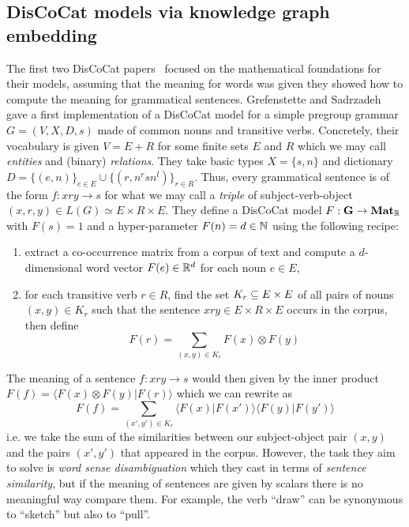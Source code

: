 
\subsection{DisCoCat models via knowledge graph embedding}

The first two DisCoCat papers~\cite{ClarkEtAl08,ClarkEtAl10} focused on the mathematical foundations for their models, assuming that the meaning for words was given they showed how to compute the meaning for grammatical sentences.
Grefenstette and Sadrzadeh~\cite{GrefenstetteSadrzadeh11} gave a first implementation of a DisCoCat model for a simple pregroup grammar $G = (V, X, D, s)$ made of common nouns and transitive verbs.
Concretely, their vocabulary is given $V = E + R$ for some finite sets $E$ and $R$ which we may call \emph{entities} and (binary) \emph{relations}.
They take basic types $X = \{ s, n \}$ and dictionary $D = \{ (e, n) \}_{e \in E} \cup \{ (r, n^r s n^l) \}_{r \in R}$.
Thus, every grammatical sentence is of the form $f : x r y \to s$ for what we may call a \emph{triple} of subject-verb-object $(x, r, y) \in L(G) \simeq E \times R \times E$.
They define a DisCoCat model $F : \mathbf{G} \to \mathbf{Mat}_{\mathbb{R}}$ with $F(s) = 1$ and a hyper-parameter $F(n) = d \in \mathbb{N}$ using the following recipe:
\begin{enumerate}
\item extract a co-occurrence matrix from a corpus of text and compute a $d$-dimensional word vector $F(e) \in \mathbb{R}^d$ for each noun $e \in E$,
\item for each transitive verb $r \in R$, find the set $K_r \subseteq E \times E$ of all pairs of nouns $(x, y) \in K_r$ such that the sentence $x r y \in E \times R \times E$ occurs in the corpus, then define
$$F(r) = \sum_{(x, y) \in K_r} F(x) \otimes F(y)$$
\end{enumerate}
The meaning of a sentence $f : x r y \to s$ would then given by the inner product $F(f) = \langle F(x) \otimes F(y) \vert F(r) \rangle$ which we can rewrite as
$$F(f) = \sum_{(x', y') \in K_r} \langle F(x) \vert F(x') \rangle \langle F(y) \vert F(y') \rangle$$
i.e. we take the sum of the similarities between our subject-object pair $(x, y)$ and the pairs $(x', y')$ that appeared in the corpus.
However, the task they aim to solve is \emph{word sense disambiguation} which they cast in terms of \emph{sentence similarity}, but if the meaning of sentences are given by scalars there is no meaningful way compare them.
For example, the verb ``draw'' can be synonymous to ``sketch'' but also to ``pull''.
